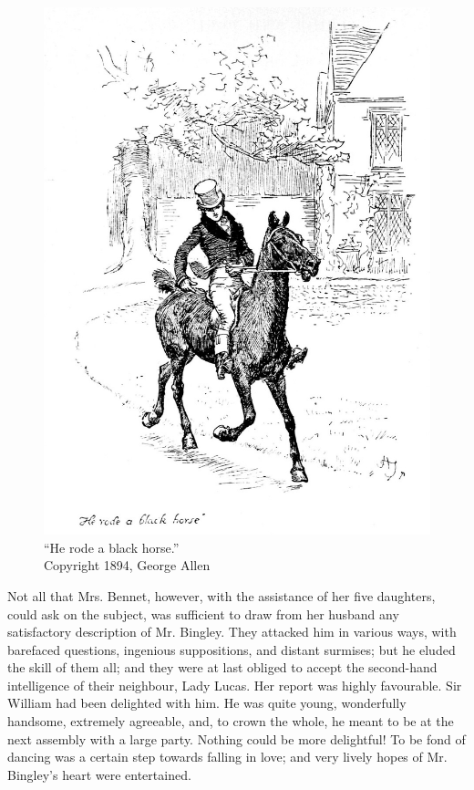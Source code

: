 \begin{figure}[htbp]
    \centering
    \includegraphics[width=\textwidth]{illustrations/i_039_a.jpg}
    \caption{“He rode a black horse.”\\ Copyright 1894, George Allen}
    \label{fig:image}
\end{figure}


Not all that Mrs. Bennet, however, with the assistance of her five daughters, could ask on the subject, was sufficient to draw from her husband any satisfactory description of Mr. Bingley. They attacked him in various ways, with barefaced questions, ingenious suppositions, and distant surmises; but he eluded the skill of them all; and they were at last obliged to accept the second-hand intelligence of their neighbour, Lady Lucas. Her report was highly favourable. Sir William had been delighted with him. He was quite young, wonderfully handsome, extremely agreeable, and, to crown the whole, he meant to be at the next assembly with a large party. Nothing could be more delightful! To be fond of dancing was a certain step towards falling in love; and very lively hopes of Mr. Bingley's heart were entertained.

